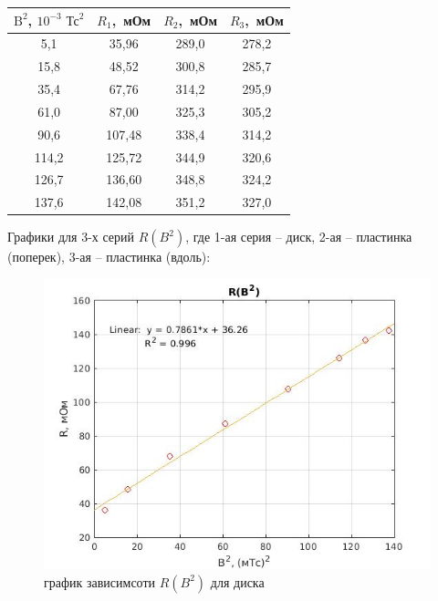 \documentclass[a4paper, 12pt]{article}%
\begin{document}
\begin{table}[!h]
\begin{center}
\begin{tabular}{|c|c|c|c|}
\hline $\mathrm{B}^{2}$, $10^{-3} \text{ Тс}^2$ & $R_1$,\ мОм & $R_2$,\ мОм  & $R_3$,\ мОм  \\
\hline 5,1   & 35,96  & 289,0 & 278,2 \\
\hline 15,8  & 48,52  & 300,8 & 285,7 \\
\hline 35,4  & 67,76  & 314,2 & 295,9 \\
\hline 61,0  & 87,00  & 325,3 & 305,2 \\
\hline 90,6  & 107,48 & 338,4 & 314,2 \\
\hline 114,2 & 125,72 & 344,9 & 320,6 \\
\hline 126,7 & 136,60 & 348,8 & 324,2 \\
\hline 137,6 & 142,08 & 351,2 & 327,0 \\
\hline
\end{tabular}
\end{center}
\end{table}

Графики для 3-х серий $R(B^2)$, где 1-ая серия -- диск, 2-ая -- пластинка (поперек), 3-ая -- пластинка (вдоль):


\begin{center}
\begin{figure}[!h]
    \centering
    \includegraphics[width = 10 cm]{graph1(disk).jpg}
    \caption{график зависимсоти $R(B^2)$ для диска}
    \label{ser1}
\end{figure}
\end{center}
\end{document}

